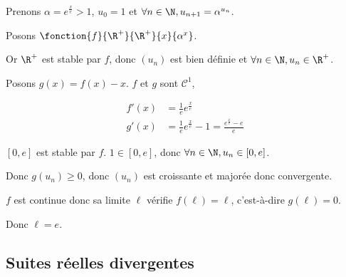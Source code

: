 \begin{exemple}
    Prenons $\alpha = e^{\frac x e} > 1$, $u_0 = 1$ et $\forall n \in \N, u_{n + 1} = \alpha^{u_n}$.

    Posons $\fonction{f}{\R^+}{\R^+}{x}{\alpha^x}$.

    Or $\R^+$ est stable par $f$, donc $(u_n)$ est bien définie et $\forall n \in \N, u_n \in \R^+$.

    Posons $g(x) = f(x) - x$. 
    $f$ et $g$ sont $\mathscr C^1$, 

    \begin{align*}
        f'(x) &=  \frac 1 e e^{\frac x e} \\
        g'(x) &=  \frac 1 e e^{\frac x e} - 1 = \frac{e^{\frac x e} - e}{e}
    \end{align*}


    \begin{center}
    \end{center}

    $[0, e]$ est stable par $f$. $1 \in [0, e]$, donc $\forall n \in \N, u_n \in [0, e]$.

    Donc $g(u_n) \geqslant 0$, donc $(u_n)$ est croissante et majorée donc convergente. 

    $f$ est continue donc sa limite $\ell$ vérifie $f(\ell) = \ell$, c'est-à-dire 
    $g(\ell) = 0$.

    Donc $\ell = e$.
\end{exemple}

\subsection{Suites réelles divergentes}

